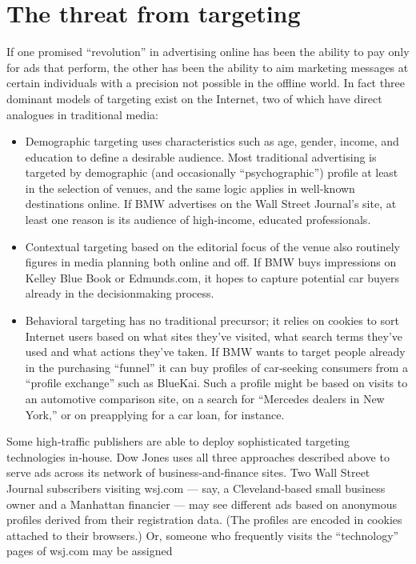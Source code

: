 \section{The threat from targeting}
If one promised ``revolution'' in advertising online has been the ability to
pay only for ads that perform, the other has been the ability to aim
marketing messages at certain individuals with a precision not possible in
the offline world. In fact three dominant models of targeting exist on the
Internet, two of which have direct analogues in traditional media:
\begin{itemize}
\item Demographic targeting uses characteristics such as age, gender,
income, and education to define a desirable audience. Most
traditional advertising is targeted by demographic (and
occasionally ``psychographic'') profile at least in the selection of
venues, and the same logic applies in well‐known destinations
online. If BMW advertises on the Wall Street Journal’s site, at
least one reason is its audience of high‐income, educated
professionals.
\item Contextual targeting based on the editorial focus of the venue
also routinely figures in media planning both online and off. If
BMW buys impressions on Kelley Blue Book or Edmunds.com,
it hopes to capture potential car buyers already in the decisionmaking
process.
\item Behavioral targeting has no traditional precursor; it relies on
cookies to sort Internet users based on what sites they’ve
visited, what search terms they’ve used and what actions
they’ve taken. If BMW wants to target people already in the
purchasing ``funnel'' it can buy profiles of car‐seeking
consumers from a ``profile exchange'' such as BlueKai. Such a
profile might be based on visits to an automotive comparison
site, on a search for ``Mercedes dealers in New York,'' or on preapplying
for a car loan, for instance.
\end{itemize}
Some high‐traffic publishers are able to deploy sophisticated targeting
technologies in‐house. Dow Jones uses all three approaches described
above to serve ads across its network of business‐and‐finance sites. Two
Wall Street Journal subscribers visiting wsj.com — say, a Cleveland‐based
small business owner and a Manhattan financier — may see different ads
based on anonymous profiles derived from their registration data. (The
profiles are encoded in cookies attached to their browsers.) Or, someone
who frequently visits the ``technology'' pages of wsj.com may be assigned

